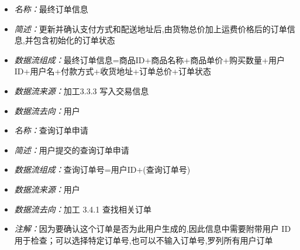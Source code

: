 \vspace{-1mm}

\begin{itemize}
	\item \textit{名称：}最终订单信息
	\item \textit{简述：}更新并确认支付方式和配送地址后,由货物总价加上运费价格后的订单信息,并包含初始化的订单状态
	\item \textit{数据流组成：}最终订单信息=商品ID+商品名称+商品单价+购买数量+用户ID+用户名+付款方式+收货地址+订单总价+订单状态
	\item \textit{数据流来源：}加工3.3.3 写入交易信息
	\item \textit{数据流去向：}用户
\end{itemize}

\vspace{-1mm}

\begin{itemize}
	\item \textit{名称：}查询订单申请
	\item \textit{简述：}用户提交的查询订单申请
	\item \textit{数据流组成：}查询订单号=用户ID+(查询订单号)
	\item \textit{数据流来源：}用户
	\item \textit{数据流去向：}加工 3.4.1 查找相关订单
	\item \textit{注解：}因为要确认这个订单是否为此用户生成的,因此信息中需要附带用户 ID 用于检查；可以选择特定订单号,也可以不输入订单号,罗列所有用户订单
\end{itemize}

\vspace{-1mm}
